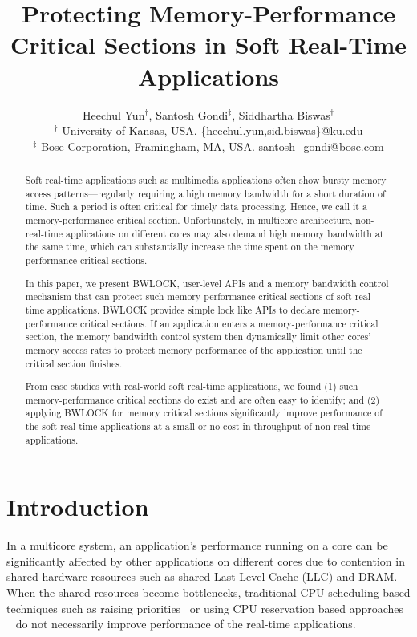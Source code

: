 \documentclass[times, 10pt,onecolumn]{article}
\title{Protecting Memory-Performance Critical Sections in Soft Real-Time Applications}
\author{Heechul Yun$^\dagger$, Santosh Gondi$^\ddagger$, Siddhartha Biswas$^\dagger$\\
$^\dagger$ University of Kansas, USA. \{heechul.yun,sid.biswas\}@ku.edu\\
$^\ddagger$ Bose Corporation, Framingham, MA, USA. santosh\_gondi@bose.com
}
\date{}
\begin{document}
\maketitle
\thispagestyle{empty}
\begin{abstract}
Soft real-time applications such as multimedia applications often
show bursty memory access patterns---regularly requiring a high
memory bandwidth for a short duration of time. Such a period is often
critical for timely data processing. Hence, we call it a
memory-performance critical section. Unfortunately, in multicore
architecture, non-real-time applications on different cores may also
demand high memory bandwidth at the same time, which can substantially
increase the time spent on the memory performance critical sections.

In this paper, we present BWLOCK, user-level APIs and a memory
bandwidth control mechanism that can protect such memory performance
critical sections of soft real-time applications. BWLOCK provides
simple lock like APIs to declare memory-performance critical
sections. If an application enters a memory-performance critical
section, the memory bandwidth control system then dynamically limit
other cores' memory access rates to protect memory performance of the
application until the critical section finishes.

From case studies with real-world soft real-time applications, we
found (1) such memory-performance critical sections do exist and are
often easy to identify; and (2) applying BWLOCK for memory critical
sections significantly improve performance of the soft real-time
applications at a small or no cost in throughput of non real-time
applications.
\end{abstract}



\section{Introduction}



In a multicore system, an application's performance running on a core
can be significantly affected by other applications on different cores
due to contention in shared hardware resources such as shared Last-Level
Cache (LLC) and DRAM. When the shared resources become bottlenecks,
traditional CPU scheduling based techniques such as raising
priorities~\cite{lehoczky1989rate} or using CPU reservation based approaches
~\cite{faggioli2009implementation,kato2010ecrts,abeni1998rtss}
do not necessarily improve performance of the real-time applications.
\end{document}

